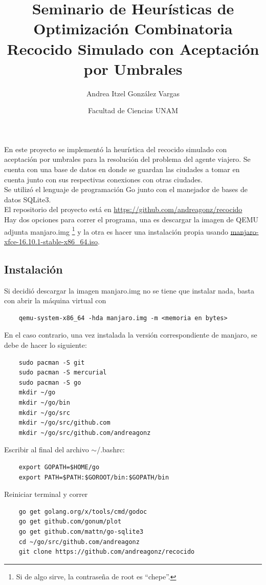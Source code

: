 \documentclass[12pt]{article}
\title{Seminario de Heurísticas de Optimización Combinatoria \\ Recocido Simulado con Aceptación por Umbrales}
\author{Andrea Itzel González Vargas}
\date{Facultad de Ciencias UNAM}
\begin{document}
\maketitle
En este proyecto se implementó la heurística del recocido simulado con aceptación por umbrales para la resolución del problema del agente viajero. Se cuenta con una base de datos en donde se guardan las ciudades a tomar en cuenta junto con sus respectivas conexiones con otras ciudades. \\

Se utilizó el lenguaje de programación Go junto con el manejador de bases de datos SQLite3. \\
El repositorio del proyecto está en \url{https://github.com/andreagonz/recocido} \\

Hay dos opciones para correr el programa, una es descargar la imagen de QEMU adjunta \textsf{manjaro.img} \footnote{Si de algo sirve, la contraseña de root es ``chepe''.} y la otra es hacer una instalación propia usando \href{https://sourceforge.net/projects/manjarolinux/files/archive/16.10.1/xfce/manjaro-xfce-16.10.1-stable-x86_64.iso}{manjaro-xfce-16.10.1-stable-x86\_64.iso}.

\subsection{Instalación}
Si decidió descargar la imagen \textsf{manjaro.img} no se tiene que instalar nada, basta con abrir la máquina virtual con
\begin{verbatim}
    qemu-system-x86_64 -hda manjaro.img -m <memoria en bytes>
\end{verbatim}

En el caso contrario, una vez instalada la versión correspondiente de manjaro, se debe de hacer lo siguiente: 

\begin{verbatim}
    sudo pacman -S git
    sudo pacman -S mercurial
    sudo pacman -S go
    mkdir ~/go
    mkdir ~/go/bin
    mkdir ~/go/src
    mkdir ~/go/src/github.com
    mkdir ~/go/src/github.com/andreagonz
\end{verbatim}
\newpage
Escribir al final del archivo \textsf{$\sim$/.bashrc}:
\begin{verbatim}
    export GOPATH=$HOME/go
    export PATH=$PATH:$GOROOT/bin:$GOPATH/bin
\end{verbatim}
Reiniciar terminal y correr
\begin{verbatim}
    go get golang.org/x/tools/cmd/godoc
    go get github.com/gonum/plot
    go get github.com/mattn/go-sqlite3
    cd ~/go/src/github.com/andreagonz
    git clone https://github.com/andreagonz/recocido
\end{verbatim}
\end{document}
